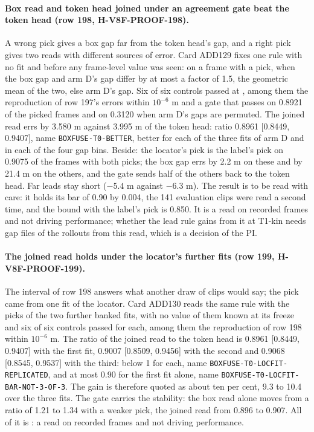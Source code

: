 \paragraph{Box read and token head joined under an agreement gate beat the token head (row 198, H-V8F-PROOF-198).} A wrong pick gives a box gap far from the token head's gap, and a right pick gives two reads with different sources of error. Card ADD129 fixes one rule with no fit and before any frame-level value was seen: on a frame with a pick, when the box gap and arm D's gap differ by at most a factor of 1.5, the geometric mean of the two, else arm D's gap. Six of six controls passed at , among them the reproduction of row 197's errors within $10^{-6}$ m and a gate that passes on 0.8921 of the picked frames and on 0.3120 when arm D's gaps are permuted. The joined read errs by 3.580 m against 3.995 m of the token head: ratio 0.8961 [0.8449, 0.9407], name \texttt{BOXFUSE-T0-BETTER}, better for each of the three fits of arm D and in each of the four gap bins. Beside: the locator's pick is the label's pick on 0.9075 of the frames with both picks; the box gap errs by 2.2 m on these and by 21.4 m on the others, and the gate sends half of the others back to the token head. Far leads stay short ($-5.4$ m against $-6.3$ m). The result is to be read with care: it holds its bar of 0.90 by 0.004, the 141 evaluation clips were read a second time, and the bound with the label's pick is 0.850. It is a read on recorded frames and not driving performance; whether the lead rule gains from it at T1-kin needs gap files of the rollouts from this read, which is a decision of the PI.

\paragraph{The joined read holds under the locator's further fits (row 199, H-V8F-PROOF-199).} The interval of row 198 answers what another draw of clips would say; the pick came from one fit of the locator. Card ADD130 reads the same rule with the picks of the two further banked fits, with no value of them known at its freeze and six of six controls passed for each, among them the reproduction of row 198 within $10^{-6}$ m. The ratio of the joined read to the token head is 0.8961 [0.8449, 0.9407] with the first fit, 0.9007 [0.8509, 0.9456] with the second and 0.9068 [0.8545, 0.9537] with the third: below 1 for each, name \texttt{BOXFUSE-T0-LOCFIT-REPLICATED}, and at most 0.90 for the first fit alone, name \texttt{BOXFUSE-T0-LOCFIT-BAR-NOT-3-OF-3}. The gain is therefore quoted as about ten per cent, 9.3 to 10.4 over the three fits. The gate carries the stability: the box read alone moves from a ratio of 1.21 to 1.34 with a weaker pick, the joined read from 0.896 to 0.907. All of it is : a read on recorded frames and not driving performance.

